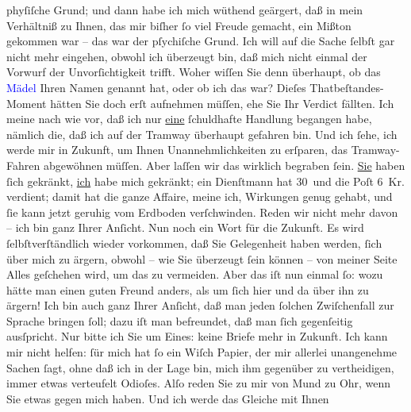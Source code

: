                phyſiſche Grund; und dann habe ich mich wüthend geärgert, daß in mein Verhältniß zu
               Ihnen, das mir biſher ſo viel Freude gemacht, ein Mißton gekommen war – das war der
               pſychiſche Grund. Ich will auf die Sache ſelbſt gar nicht mehr eingehen, obwohl ich
               überzeugt bin, daß mich nicht einmal der Vorwurf der Unvorſich{\pb}tigkeit trifft. Woher wiſſen Sie
               denn überhaupt, ob das \textcolor{blue}{Mädel}{}
               Ihren Namen genannt hat, oder ob ich das war? Dieſes Thatbeſtandes-Moment hätten Sie
               doch erſt aufnehmen müſſen, ehe Sie Ihr Verdict fällten. Ich meine nach wie vor, daß
               ich nur \uline{eine} ſchuldhafte Handlung begangen habe,
               nämlich die, daß ich auf der Tramway überhaupt gefahren bin. Und ich ſehe, ich werde
               mir in Zukunft, um Ihnen Unannehmlichkeiten zu erſparen, das Tramway-Fahren
               abgewöhnen müſſen.\pend
           \pstart
           Aber laſſen wir das wirklich begraben ſein. \uline{Sie} haben
               ſich gekränkt, \uline{ich} habe mich gekränkt; ein Dienſtmann
               hat 30 und die Poſt 6 Kr. verdient; damit hat die ganze Affaire, meine ich, Wirkungen
               genug gehabt, und ſie kann jetzt geruhig vom Erdboden verſchwinden. Reden wir nicht
               mehr davon – ich bin ganz Ihrer Anſicht.\pend
           \pstart
           Nun noch ein Wort für die Zukunft. Es wird ſelbſtverſtändlich wieder vorkommen, daß
               Sie Gelegenheit haben werden, ſich über mich zu ärgern, obwohl – wie Sie überzeugt
               ſein können – von meiner Seite Alles geſchehen wird, um das zu {\pb}vermeiden. Aber das iſt nun einmal
               ſo: wozu hätte man einen guten Freund anders, als um ſich hier und da über ihn zu
               ärgern! Ich bin auch ganz Ihrer Anſicht, daß man jeden ſolchen Zwiſchenfall zur
               Sprache bringen ſoll; dazu iſt man befreundet, daß man ſich gegenſeitig ausſpricht.
               Nur bitte ich Sie um Eines: keine Briefe mehr in Zukunft. Ich kann mir nicht  helfen: ſür mich hat ſo ein Wiſch Papier, der mir
                   allerlei unangenehme Sachen ſagt, ohne daß ich in der Lage bin, mich ihm
               gegenüber zu vertheidigen, immer etwas verteufelt Odioſes. Alſo reden Sie zu mir von
               Mund zu Ohr, wenn Sie etwas gegen mich haben. Und ich werde das Gleiche mit Ihnen

